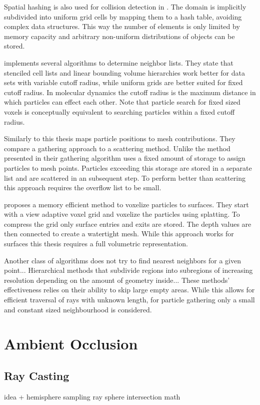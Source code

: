 \documentclass[hyperref,german,diplominf]{cgvpub}
\begin{document}
Spatial hashing is also used for collision detection in  \cite{7}. The domain is implicitly subdivided into uniform grid cells by mapping them to a hash table, avoiding complex data structures. This way the number of elements is only limited by memory capacity and arbitrary non-uniform distributions of objects can be stored.

\cite{12} implements several algorithms to determine neighbor lists. They state that stenciled cell lists and linear bounding volume hierarchies work better for data sets with variable cutoff radius, while uniform grids are better suited for fixed cutoff radius. In molecular dynamics the cutoff radius is the maximum distance in which particles can effect each other. Note that particle search for fixed sized voxels is conceptually equivalent to searching particles within a fixed cutoff radius.

Similarly to this thesis \cite{4} maps particle positions to mesh contributions. They compare a gathering approach to a scattering method. Unlike the method presented in \cite{5, 13} their gathering algorithm uses a fixed amount of storage to assign particles to mesh points. Particles exceeding this storage are stored in a separate list and are scattered in an subsequent step. To perform better than scattering this approach requires the overflow list to be small.

\cite{8} proposes a memory efficient method to voxelize particles to surfaces. They start with a view adaptive voxel grid and voxelize the particles using splatting. To compress the grid only surface entries and exits are stored. The depth values are then connected to create a watertight mesh. While this approach works for surfaces this thesis requires a full volumetric representation.

Another class of algorithms does not try to find nearest neighbors for a given point...
Hierarchical methods that subdivide regions into subregions of increasing resolution depending on the amount of geometry inside... These methods' effectiveness relies on their ability to skip large empty areas. While this allows for efficient traversal of rays with unknown length, for particle gathering only a small and constant sized neighbourhood is considered.

\chapter{Ambient Occlusion}

\section{Ray Casting}
idea + hemisphere sampling
ray sphere intersection math
\end{document}
